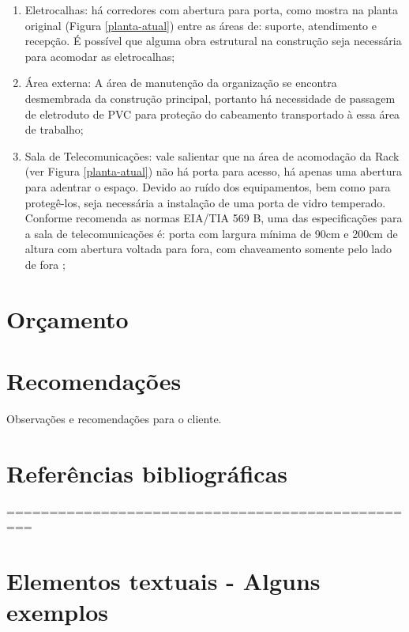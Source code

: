 \documentclass[	DIV=calc,%
							paper=a4,%
							fontsize=12pt,%
							onecolumn]{scrartcl}	 					%
\begin{document}
\begin{enumerate}
	\item Eletrocalhas: há corredores com abertura para porta, como mostra na planta original (Figura \ref{planta-atual}) entre as áreas de: suporte, atendimento e recepção. É possível que alguma obra estrutural na construção seja necessária para acomodar as eletrocalhas;
	\item Área externa: A área de manutenção da organização se encontra desmembrada da construção principal, portanto há necessidade de passagem de eletroduto de PVC para proteção do cabeamento transportado à essa área de trabalho;
	\item Sala de Telecomunicações: vale salientar que na área de acomodação da Rack (ver Figura \ref{planta-atual}) não há porta para acesso, há apenas uma abertura para adentrar o espaço. Devido ao ruído dos equipamentos, bem como para protegê-los, seja necessária a instalação de uma porta de vidro temperado. Conforme recomenda as normas EIA/TIA 569 B, uma das especificações para a sala de telecomunicações é: porta com largura mínima de 90cm e 200cm de altura com abertura voltada para fora, com chaveamento somente pelo lado de fora \cite{senai2012};
\end{enumerate}


\section{Orçamento}

\newpage


\section{Recomendações}
Observações e recomendações para o cliente.

\section{Referências bibliográficas}

\renewcommand\refname{} %

  

=================================================
\section{Elementos textuais - Alguns exemplos}
\end{document}
